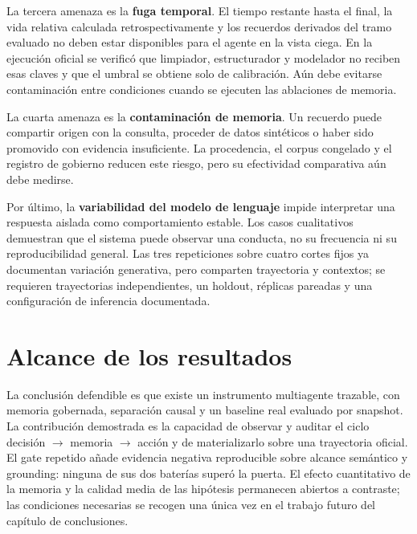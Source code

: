 La tercera amenaza es la \textbf{fuga temporal}. El tiempo restante hasta el
final, la vida relativa calculada retrospectivamente y los recuerdos derivados
del tramo evaluado no deben estar disponibles para el agente en la vista ciega.
En la ejecución oficial se verificó que limpiador, estructurador y modelador no
reciben esas claves y que el umbral se obtiene solo de calibración. Aún debe
evitarse contaminación entre condiciones cuando se ejecuten las ablaciones de
memoria.

La cuarta amenaza es la \textbf{contaminación de memoria}. Un recuerdo puede
compartir origen con la consulta, proceder de datos sintéticos o haber sido
promovido con evidencia insuficiente. La procedencia, el corpus congelado y el
registro de gobierno reducen este riesgo, pero su efectividad comparativa aún
debe medirse.

Por último, la \textbf{variabilidad del modelo de lenguaje} impide interpretar
una respuesta aislada como comportamiento estable. Los casos cualitativos
demuestran que el sistema puede observar una conducta, no su frecuencia ni su
reproducibilidad general. Las tres repeticiones sobre cuatro cortes fijos ya
documentan variación generativa, pero comparten trayectoria y contextos; se
requieren trayectorias independientes, un holdout, réplicas pareadas y una
configuración de inferencia documentada.

\section{Alcance de los resultados}

La conclusión defendible es que existe un
instrumento multiagente trazable, con memoria gobernada, separación causal y un
baseline real evaluado por snapshot. La contribución demostrada es la capacidad
de observar y auditar el ciclo decisión \(\rightarrow\) memoria
\(\rightarrow\) acción y de materializarlo sobre una trayectoria oficial. El
gate repetido añade evidencia negativa reproducible sobre alcance semántico y
grounding: ninguna de sus dos baterías superó la puerta. El efecto cuantitativo
de la memoria y la calidad media de las hipótesis permanecen abiertos a
contraste; las condiciones necesarias se recogen una única vez en el trabajo
futuro del capítulo de conclusiones.

